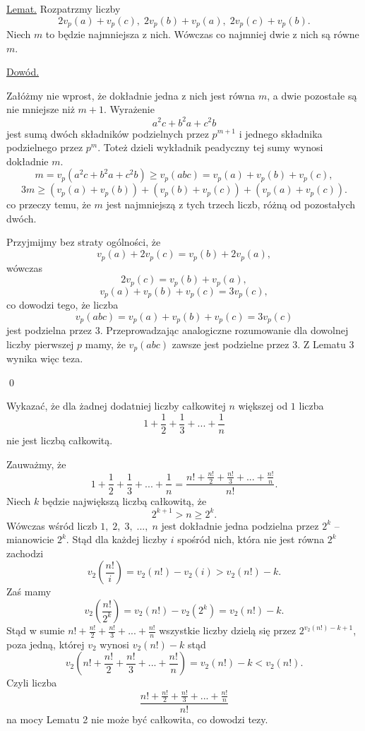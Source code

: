 \vspace{10px}


\noindent
\underline{Lemat.} Rozpatrzmy liczby
\[
	2v_p(a) + v_p(c),\; 2v_p(b) + v_p(a),\; 2v_p(c) + v_p(b).
\] 
Niech $m$ to będzie najmniejsza z nich. Wówczas co najmniej dwie z nich są równe $m$.


\vspace{5px}

\noindent
\underline{Dowód.}

\noindent
Załóżmy nie wprost, że dokładnie jedna z nich jest równa $m$, a dwie pozostałe są nie mniejsze niż $m + 1$. Wyrażenie
\[
	a^2c + b^2a + c^2b
\]
jest sumą dwóch składników podzielnych przez $p^{m + 1}$ i jednego składnika podzielnego przez $p^m$. Toteż dzieli wykładnik peadyczny tej sumy wynosi dokładnie $m$.
\[
	m = v_p(a^2c + b^2a + c^2b) \geqslant v_p(abc) = v_p(a) + v_p(b) + v_p(c),
\]
\[
	3m \geqslant (v_p(a) + v_p(b)) + (v_p(b) + v_p(c)) + (v_p(a)  + v_p(c)).
\]
co przeczy temu, że $m$ jest najmniejszą z tych trzech liczb, różną od pozostałych dwóch.

\vspace{15px}

\noindent
Przyjmijmy bez straty ogólności, że
\[
	v_p(a) + 2v_p(c) = v_p(b) + 2v_p(a),
\]
wówczas
\[
	2v_p(c) = v_p(b) + v_p(a),
\]
\[
	v_p(a) + v_p(b) + v_p(c) = 3v_p(c),
\]
co dowodzi tego, że liczba
\[
	v_p(abc) = v_p(a) + v_p(b) + v_p(c) = 3v_p(c)
\]
jest podzielna przez $3$. Przeprowadzając analogiczne rozumowanie dla dowolnej liczby pierwszej $p$ mamy, że $v_p(abc)$ zawsze jest podzielne przez $3$. Z Lematu $3$ wynika więc teza. 

\qed

\vspace{10px}


\noindent
Wykazać, że dla żadnej dodatniej liczby całkowitej $n$ większej od $1$ liczba
\[
	1 + \frac{1}{2} + \frac{1}{3} + ... + \frac{1}{n}
\]
nie jest liczbą całkowitą.

\vspace{5px}


\noindent
Zauważmy, że
\[
	1 + \frac{1}{2} + \frac{1}{3} + ... + \frac{1}{n} = \frac{n! + \frac{n!}{2} + \frac{n!}{3} + ... + \frac{n!}{n}}{n!}.
\]
Niech $k$ będzie największą liczbą całkowitą, że
\[
	2^{k + 1} > n \geqslant 2^k.
\]
Wówczas wśród liczb $1,\; 2,\; 3,\; ..., \; n$ jest dokładnie jedna podzielna przez $2^{k}$ -- mianowicie $2^{k}$. Stąd dla każdej liczby $i$ spośród nich, która nie jest równa $2^k$ zachodzi
\[
	v_2\left(\frac{n!}{i}\right) = v_2(n!) - v_2(i) > v_2(n!) - k.
\]
Zaś mamy
\[
	v_2\left(\frac{n!}{2^k}\right) = v_2(n!) - v_2(2^k) = v_2(n!) - k.
\]
Stąd w sumie $n! + \frac{n!}{2} + \frac{n!}{3} + ... + \frac{n!}{n}$ wszystkie liczby dzielą się przez $2^{v_2(n!) - k + 1}$, poza jedną, której $v_2$ wynosi $v_2(n!) - k$ stąd
\[
	v_2\left(n! + \frac{n!}{2} + \frac{n!}{3} + ... + \frac{n!}{n}\right) = v_2(n!) - k < v_2(n!).
\]
Czyli liczba
\[
	\frac{n! + \frac{n!}{2} + \frac{n!}{3} + ... + \frac{n!}{n}}{n!}
\]
na mocy Lematu 2 nie może być całkowita, co dowodzi tezy.

